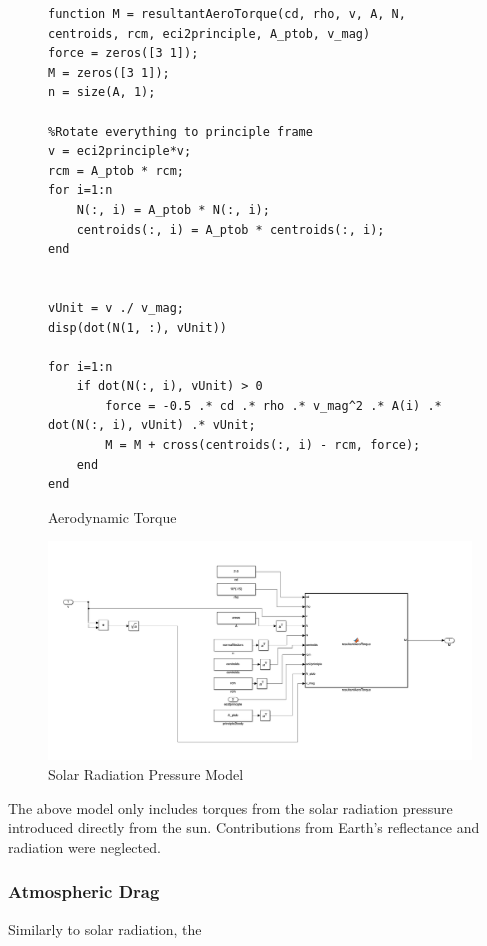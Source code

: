 \begin{figure} [H]
    \centering
    \begin{lstlisting}
function M = resultantAeroTorque(cd, rho, v, A, N, centroids, rcm, eci2principle, A_ptob, v_mag)
force = zeros([3 1]);
M = zeros([3 1]);
n = size(A, 1);

%Rotate everything to principle frame
v = eci2principle*v;
rcm = A_ptob * rcm;
for i=1:n
    N(:, i) = A_ptob * N(:, i);
    centroids(:, i) = A_ptob * centroids(:, i);
end 


vUnit = v ./ v_mag;
disp(dot(N(1, :), vUnit))

for i=1:n
    if dot(N(:, i), vUnit) > 0
        force = -0.5 .* cd .* rho .* v_mag^2 .* A(i) .* dot(N(:, i), vUnit) .* vUnit;
        M = M + cross(centroids(:, i) - rcm, force);
    end
end
    \end{lstlisting}
    \caption{Aerodynamic Torque}
    \label{fig:dual_spin_simulink_code}
\end{figure}

\begin{figure}[H]
    \centering
    \captionsetup{justification = centering}
    \includegraphics[width = 15cm]{Images/PS5/aeroTorqueSimulink.png}
    \caption{Solar Radiation Pressure Model}
    \label{fig:simulink_sol}
\end{figure}

The above model only includes torques from the solar radiation pressure introduced directly from the sun. Contributions from Earth's reflectance and radiation were neglected.


\subsubsection{Atmospheric Drag}

Similarly to solar radiation, the 

